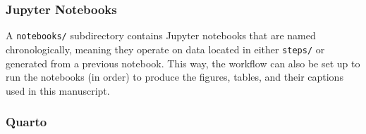 \documentclass[
  11pt,
  a4paper,
]{scrbook}
\begin{document}
\subsubsection{Jupyter Notebooks}\label{jupyter-notebooks}

A \texttt{notebooks/} subdirectory contains Jupyter notebooks that are
named chronologically, meaning they operate on data located in either
\texttt{steps/} or generated from a previous notebook. This way, the
workflow can also be set up to run the notebooks (in order) to produce
the figures, tables, and their captions used in this manuscript.

\subsubsection{Quarto}\label{quarto}
\end{document}
